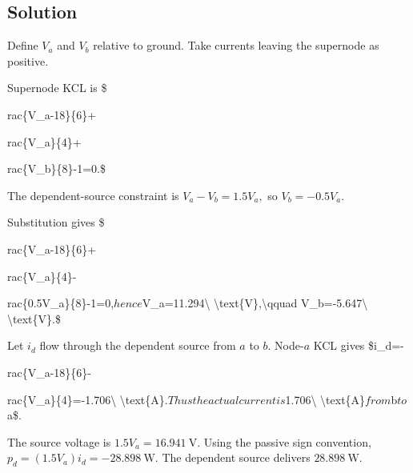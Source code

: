 \documentclass[11pt]{article}
\begin{document}
\subsection*{Solution}

Define $V_a$ and $V_b$ relative to ground. Take currents leaving the supernode as positive.\par

Supernode KCL is \$\par
rac\{V\_a-18\}\{6\}+\par
rac\{V\_a\}\{4\}+\par
rac\{V\_b\}\{8\}-1=0.\$\par

The dependent-source constraint is $V_a-V_b=1.5V_a,$ so $V_b=-0.5V_a.$\par

Substitution gives \$\par
rac\{V\_a-18\}\{6\}+\par
rac\{V\_a\}\{4\}-\par
rac\{0.5V\_a\}\{8\}-1=0,$ hence $V\_a=11.294\textbackslash{} \textbackslash{}text\{V\},\textbackslash{}qquad V\_b=-5.647\textbackslash{} \textbackslash{}text\{V\}.\$\par

Let $i_d$ flow through the dependent source from $a$ to $b$. Node-$a$ KCL gives \$i\_d=-\par
rac\{V\_a-18\}\{6\}-\par
rac\{V\_a\}\{4\}=-1.706\textbackslash{} \textbackslash{}text\{A\}.$ Thus the actual current is $1.706\textbackslash{} \textbackslash{}text\{A\}$ from $b$ to $a\$.\par

The source voltage is $1.5V_a=16.941\ \text{V}.$ Using the passive sign convention, $p_d=(1.5V_a)i_d=-28.898\ \text{W}.$ The dependent source delivers $28.898\ \text{W}$.\par
\end{document}
